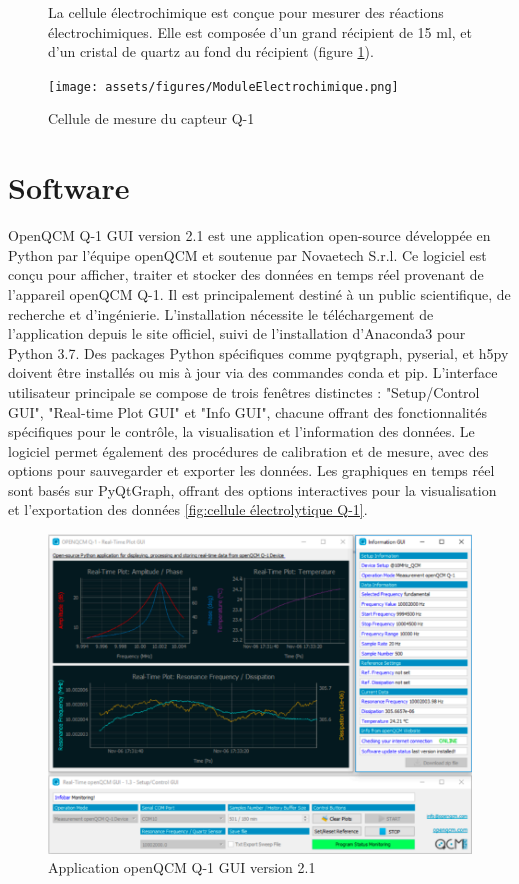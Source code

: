 \begin{figure}[H]
    \centering
    \begin{minipage}{0.48\textwidth}
        \small
    La cellule électrochimique est conçue pour mesurer des réactions électrochimiques.
    Elle est composée d'un grand récipient de 15 ml, et d'un cristal de quartz au fond du récipient (figure \ref{fig:cellule electrolitique Q-1}).
    \end{minipage}\hfill
    \begin{minipage}{0.48\textwidth}
        \centering
        \texttt{[image: assets/figures/ModuleElectrochimique.png]}
        \caption{Cellule de mesure du capteur Q-1}
        \label{fig:cellule electrolitique Q-1}
    \end{minipage}
\end{figure}

\section{Software}
OpenQCM Q-1 GUI version 2.1 est une application open-source développée en Python par l'équipe openQCM et soutenue par Novaetech S.r.l. Ce logiciel est conçu pour afficher, traiter et stocker des données en temps réel provenant de l'appareil openQCM Q-1. Il est principalement destiné à un public scientifique, de recherche et d'ingénierie. L'installation nécessite le téléchargement de l'application depuis le site officiel, suivi de l'installation d'Anaconda3 pour Python 3.7. Des packages Python spécifiques comme pyqtgraph, pyserial, et h5py doivent être installés ou mis à jour via des commandes conda et pip. L'interface utilisateur principale se compose de trois fenêtres distinctes : "Setup/Control GUI", "Real-time Plot GUI" et "Info GUI", chacune offrant des fonctionnalités spécifiques pour le contrôle, la visualisation et l'information des données. Le logiciel permet également des procédures de calibration et de mesure, avec des options pour sauvegarder et exporter les données. Les graphiques en temps réel sont basés sur PyQtGraph, offrant des options interactives pour la visualisation et l'exportation des données \ref{fig:cellule électrolytique Q-1}.

\begin{figure}[H]
    \centering
    \includegraphics[width=\textwidth]{assets/figures/QCM-GUI.png}
    \caption{Application openQCM Q-1 GUI version 2.1\cite{manual-openqcmQ1}}
    \label{fig:QCM-GUI}
\end{figure}